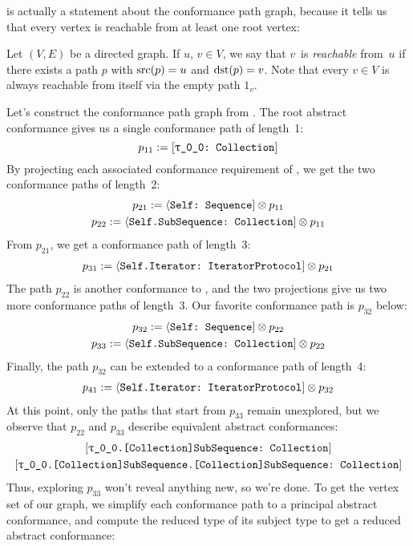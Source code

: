 \documentclass[../generics]{subfiles}
\begin{document}
 is actually a statement about the conformance path graph, because it tells us that every vertex is reachable from at least one root vertex:
\begin{definition}
Let $(V, E)$ be a directed graph. If $u$, $v\in V$, we say that $v$~is \emph{reachable} from~$u$ if there exists a path $p$ with $\operatorname{src}(p)=u$ and $\operatorname{dst}(p)=v$. Note that every $v\in V$ is always reachable from itself via the empty path $1_v$.
\end{definition}

\begin{example}\label{conformance path graph example}
Let's construct the conformance path graph from . The root abstract conformance gives us a single conformance path of length~1:
\[p_{11} := \ConfReq{\rT}{Collection}\]
By projecting each associated conformance requirement of \tCollection, we get the two conformance paths of length~2:
\begin{gather*}
p_{21} := \langle\texttt{Self:~Sequence}]\otimes p_{11}\\
p_{22} := \langle\texttt{Self.SubSequence:~Collection}]\otimes p_{11}
\end{gather*}
From $p_{21}$, we get a conformance path of length~3:
\begin{gather*}
p_{31} := \langle\texttt{Self.Iterator:~IteratorProtocol}] \otimes p_{21}
\end{gather*}
The path $p_{22}$ is another conformance to \tCollection, and the two projections give us two more conformance paths of length~3. Our favorite conformance path is $p_{32}$ below:
\begin{gather*}
p_{32} := \langle\texttt{Self:~Sequence}]\otimes p_{22}\\
p_{33} := \langle\texttt{Self.SubSequence:~Collection}]\otimes p_{22}
\end{gather*}
Finally, the path $p_{32}$ can be extended to a conformance path of length~4:
\begin{gather*}
p_{41} := \langle\texttt{Self.Iterator:~IteratorProtocol}] \otimes p_{32}
\end{gather*}
At this point, only the paths that start from $p_{33}$ remain unexplored, but we observe that $p_{22}$ and $p_{33}$ describe equivalent abstract conformances:
\begin{gather*}
\ConfReq{\rT.[Collection]SubSequence}{Collection}\\
\ConfReq{\rT.[Collection]SubSequence.[Collection]SubSequence}{Collection}
\end{gather*}
Thus, exploring $p_{33}$ won't reveal anything new, so we're done. To get the vertex set of our graph, we simplify each conformance path to a principal abstract conformance, and compute the reduced type of its subject type to get a reduced abstract conformance:

\end{example}
\end{document}
